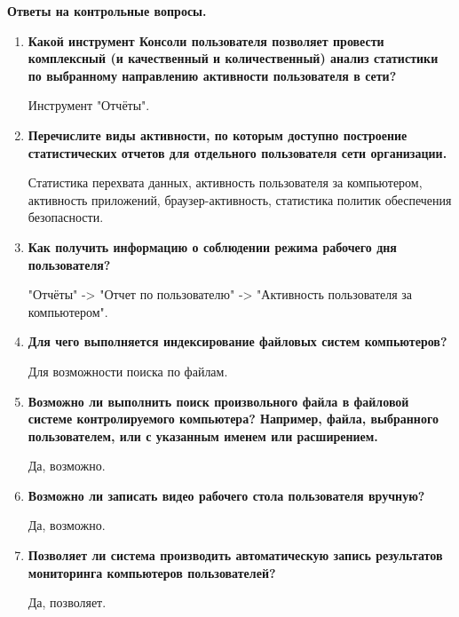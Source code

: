 \documentclass[a4paper,14pt]{extarticle}
\begin{document}
    
    \textbf{Ответы на контрольные вопросы.}
    \begin{enumerate}
        \item \textbf{ Какой инструмент Консоли пользователя позволяет провести комплексный
    (и качественный и количественный) анализ статистики по выбранному направлению
    активности пользователя в сети? }

    \qquad Инструмент "Отчёты".
        \item \textbf{ Перечислите виды активности, по которым доступно построение
    статистических отчетов для отдельного пользователя сети организации. }

    \qquad Статистика перехвата данных, активность пользователя за компьютером, активность приложений,
    браузер-активность, статистика политик обеспечения безопасности.
        \item \textbf{ Как получить информацию о соблюдении режима рабочего дня
    пользователя? }

    \qquad "Отчёты" -> "Отчет по пользователю" -> "Активность пользователя за компьютером".
        \item \textbf{ Для чего выполняется индексирование файловых систем компьютеров? }

    \qquad Для возможности поиска по файлам.
        \item \textbf{ Возможно ли выполнить поиск произвольного файла в файловой системе
    контролируемого компьютера? Например, файла, выбранного пользователем, или с
    указанным именем или расширением. }

    \qquad Да, возможно.
        \item \textbf{ Возможно ли записать видео рабочего стола пользователя вручную? }

    \qquad Да, возможно.
        \item \textbf{ Позволяет ли система производить автоматическую запись результатов
    мониторинга компьютеров пользователей? }

    \qquad Да, позволяет.
    \end{enumerate}
    
\end{document}
